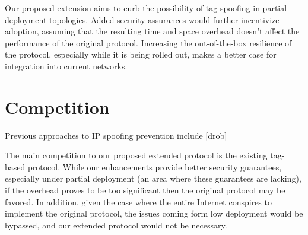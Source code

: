 \documentclass[12pt]{article} %
\begin{document}
	Our proposed extension aims to curb the possibility of tag spoofing in partial deployment topologies. Added security assurances would further incentivize adoption, assuming that the resulting time and space overhead doesn't affect the performance of the original protocol. Increasing the out-of-the-box resilience of the protocol, especially while it is being rolled out, makes a better case for integration into current networks. 

\section{Competition} 

	Previous approaches to IP spoofing prevention include [drob]

	The main competition to our proposed extended protocol is the existing tag-based protocol. While our enhancements provide better security guarantees, especially under partial deployment (an area where these guarantees are lacking), if the overhead proves to be too significant then the original protocol may be favored. In addition, given the case where the entire Internet conspires to implement the original protocol, the issues coming form low deployment would be bypassed, and our extended protocol would not be necessary.






\end{document}
